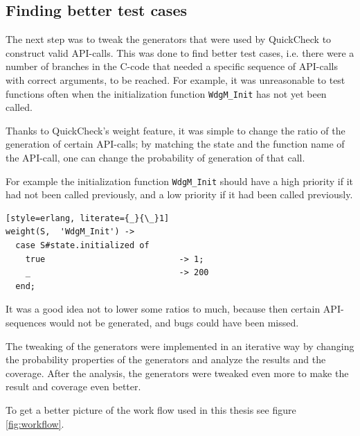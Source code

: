 \subsection{Finding better test cases}
The next step was to tweak the generators that were used by QuickCheck
to construct valid API-calls. This was done to find better test cases,
i.e. there were a number of branches in the C-code that needed a
specific sequence of API-calls with correct arguments, to be
reached. For example, it was unreasonable to test functions often when
the initialization function \lstinline!WdgM_Init! has not yet been
called.

Thanks to QuickCheck's weight feature, it was simple to change the
ratio of the generation of certain API-calls; by matching the state
and the function name of the API-call, one can change the probability
of generation of that call.

For example the initialization function \lstinline!WdgM_Init! should
have a high priority if it had not been called previously, and a low
priority if it had been called previously.
\begin{lstlisting}[style=erlang, literate={_}{\_}1]
weight(S,  'WdgM_Init') ->
  case S#state.initialized of
    true                           -> 1;
    _                              -> 200
  end;
\end{lstlisting}
It was a good idea not to lower some ratios to much, because then
certain API-sequences would not be generated, and bugs could have been
missed.

The tweaking of the generators were implemented in an iterative way by
changing the probability properties of the generators and analyze the
results and the coverage. After the analysis, the generators were
tweaked even more to make the result and coverage even better.

To get a better picture of the work flow used in this thesis see
figure \ref{fig:workflow}.

